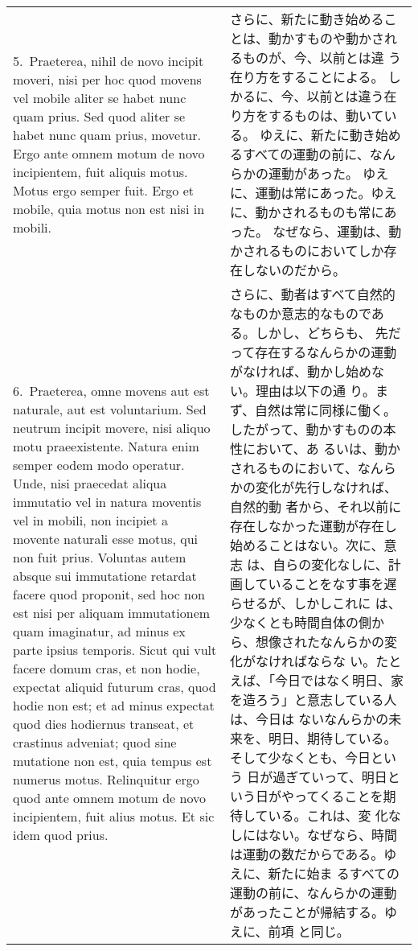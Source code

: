 \documentclass[10pt]{jsarticle} %
\begin{document}
\begin{longtable}{p{21em}p{21em}}
\\



5.~{\sc Praeterea}, nihil de novo incipit moveri, nisi per hoc quod movens vel
 mobile aliter se habet nunc quam prius. Sed quod aliter se habet nunc
 quam prius, movetur. Ergo ante omnem motum de novo incipientem, fuit
 aliquis motus. Motus ergo semper fuit. Ergo et mobile, quia motus non
 est nisi in mobili.

&


さらに、新たに動き始めることは、動かすものや動かされるものが、今、以前とは違
 う在り方をすることによる。
しかるに、今、以前とは違う在り方をするものは、動いている。
ゆえに、新たに動き始めるすべての運動の前に、なんらかの運動があった。
ゆえに、運動は常にあった。ゆえに、動かされるものも常にあった。
なぜなら、運動は、動かされるものにおいてしか存在しないのだから。

\\


6.~{\sc Praeterea}, omne movens aut est naturale, aut est voluntarium. Sed
 neutrum incipit movere, nisi aliquo motu praeexistente. Natura enim
 semper eodem modo operatur. Unde, nisi praecedat aliqua immutatio vel
 in natura moventis vel in mobili, non incipiet a movente naturali esse
 motus, qui non fuit prius. Voluntas autem absque sui immutatione
 retardat facere quod proponit, sed hoc non est nisi per aliquam
 immutationem quam imaginatur, ad minus ex parte ipsius temporis. Sicut
 qui vult facere domum cras, et non hodie, expectat aliquid futurum
 cras, quod hodie non est; et ad minus expectat quod dies hodiernus
 transeat, et crastinus adveniat; quod sine mutatione non est, quia
 tempus est numerus motus. Relinquitur ergo quod ante omnem motum de
 novo incipientem, fuit alius motus. Et sic idem quod prius.

&

さらに、動者はすべて自然的なものか意志的なものである。しかし、どちらも、
先だって存在するなんらかの運動がなければ、動かし始めない。理由は以下の通
り。まず、自然は常に同様に働く。したがって、動かすものの本性において、あ
るいは、動かされるものにおいて、なんらかの変化が先行しなければ、自然的動
者から、それ以前に存在しなかった運動が存在し始めることはない。次に、意志
は、自らの変化なしに、計画していることをなす事を遅らせるが、しかしこれに
は、少なくとも時間自体の側から、想像されたなんらかの変化がなければならな
い。たとえば、「今日ではなく明日、家を造ろう」と意志している人は、今日は
ないなんらかの未来を、明日、期待している。そして少なくとも、今日という
日が過ぎていって、明日という日がやってくることを期待している。これは、変
化なしにはない。なぜなら、時間は運動の数だからである。ゆえに、新たに始ま
るすべての運動の前に、なんらかの運動があったことが帰結する。ゆえに、前項
と同じ。

\end{longtable}
\end{document}
